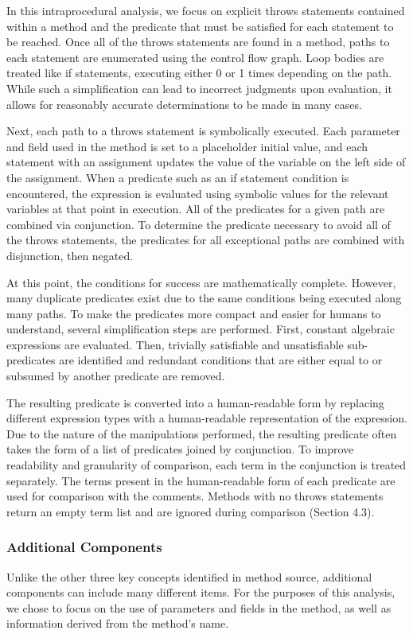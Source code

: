 \documentclass[preprint]{sigplanconf}
\begin{document}
In this intraprocedural analysis, we focus on explicit throws statements contained within a method and the predicate that must be satisfied for each statement to be reached. Once all of the throws statements are found in a method, paths to each statement are enumerated using the control flow graph. Loop bodies are treated like if statements, executing either 0 or 1 times depending on the path. While such a simplification can lead to incorrect judgments upon evaluation, it allows for reasonably accurate determinations to be made in many cases.

Next, each path to a throws statement is symbolically executed. Each parameter and field used in the method is set to a placeholder initial value, and each statement with an assignment updates the value of the variable on the left side of the assignment. When a predicate such as an if statement condition is encountered, the expression is evaluated using symbolic values for the relevant variables at that point in execution. All of the predicates for a given path are combined via conjunction. To determine the predicate necessary to avoid all of the throws statements, the predicates for all exceptional paths are combined with disjunction, then negated.

At this point, the conditions for success are mathematically complete. However, many duplicate predicates exist due to the same conditions being executed along many paths. To make the predicates more compact and easier for humans to understand, several simplification steps are performed. First, constant algebraic expressions are evaluated. Then, trivially satisfiable and unsatisfiable sub-predicates are identified and redundant conditions that are either equal to or subsumed by another predicate are removed.

The resulting predicate is converted into a human-readable form by replacing different expression types with a human-readable representation of the expression. Due to the nature of the manipulations performed, the resulting predicate often takes the form of a list of predicates joined by conjunction. To improve readability and granularity of comparison, each term in the conjunction is treated separately. The terms present in the human-readable form of each predicate are used for comparison with the comments. Methods with no throws statements return an empty term list and are ignored during comparison (Section 4.3).

\subsubsection{Additional Components}
Unlike the other three key concepts identified in method source, additional components can include many different items. For the purposes of this analysis, we chose to focus on the use of parameters and fields in the method, as well as information derived from the method's name.
\end{document}
